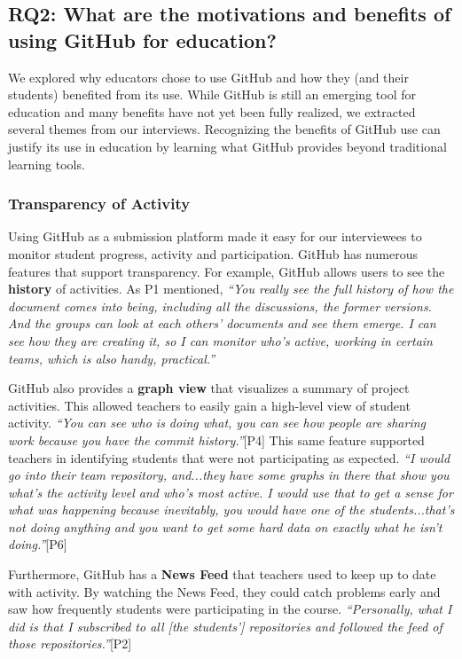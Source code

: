 \subsection{RQ2: What are the motivations and benefits of using GitHub for education?}

We explored why educators chose to use GitHub and how they (and their students) benefited from its use. While GitHub is still an emerging tool for education and many benefits have not yet been fully realized, we extracted several themes from our interviews. Recognizing the benefits of GitHub use can justify its use in education by learning what GitHub provides beyond traditional learning tools.

\subsubsection{Transparency of Activity}
Using GitHub as a submission platform made it easy for our interviewees to monitor student progress, activity and participation. GitHub has numerous features that support transparency. For example, GitHub allows users to see the \textbf{history} of activities. As P1 mentioned, \textit{``You really see the full history of how the document comes into being, including all the discussions, the former versions. And the groups can look at each others' documents and see them emerge. I can see how they are creating it, so I can monitor who's active, working in certain teams, which is also handy, practical.''}

GitHub also provides a \textbf{graph view} that visualizes a summary of project activities. This allowed teachers to easily gain a high-level view of student activity. \textit{``You can see who is doing what, you can see how people are sharing work because you have the commit history.''}[P4] This same feature supported teachers in identifying students that were not participating as expected. \textit{``I would go into their team repository, and...they have some graphs in there that show you what's the activity level and who's most active. I would use that to get a sense for what was happening because inevitably, you would have one of the students...that's not doing anything and you want to get some hard data on exactly what he isn't doing.''}[P6]

Furthermore, GitHub has a \textbf{News Feed} that teachers used to keep up to date with activity. By watching the News Feed, they could catch problems early and saw how frequently students were participating in the course. \textit{``Personally, what I did is that I subscribed to all [the students'] repositories and followed the feed of those repositories.''}[P2]

